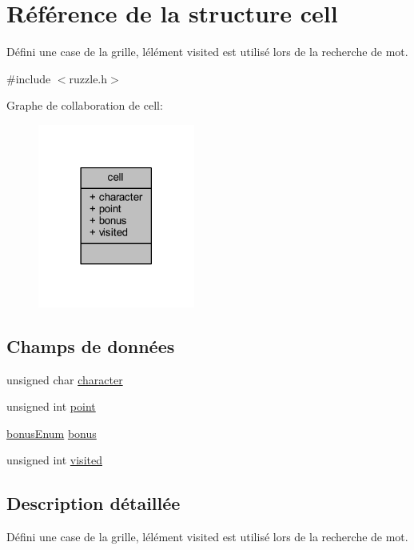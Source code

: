 \hypertarget{structcell}{}\section{Référence de la structure cell}
\label{structcell}


Défini une case de la grille, l\textquotesingle{}élément \textquotesingle{}visited\textquotesingle{} est utilisé lors de la recherche de mot.  




{\ttfamily \#include $<$ruzzle.\+h$>$}



Graphe de collaboration de cell\+:
\nopagebreak
\begin{figure}[H]
\begin{center}
\leavevmode
\includegraphics[width=146pt]{db/d45/structcell__coll__graph}
\end{center}
\end{figure}
\subsection*{Champs de données}
\begin{DoxyCompactItemize}
\item 
unsigned char \hyperlink{structcell_abe31bdd62e498dce604b14e75df142dd}{character}
\item 
unsigned int \hyperlink{structcell_a914cae0a595952eda16c33e4ca9c1cbb}{point}
\item 
\hyperlink{ruzzle_8h_af98046282a9e785a234a2ea7b10681f2}{bonus\+Enum} \hyperlink{structcell_a1724452b0364c62e84a310b3c29e80bc}{bonus}
\item 
unsigned int \hyperlink{structcell_ac5ab8c056a470676e0b6689ffdda1a05}{visited}
\end{DoxyCompactItemize}


\subsection{Description détaillée}
Défini une case de la grille, l\textquotesingle{}élément \textquotesingle{}visited\textquotesingle{} est utilisé lors de la recherche de mot. 


